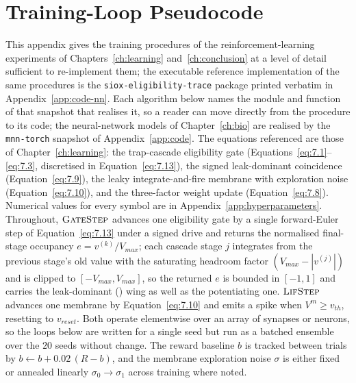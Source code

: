 \chapter{Training-Loop Pseudocode}
\label{app:pseudocode}

\noindent This appendix gives the training procedures of the reinforcement-learning
experiments of Chapters~\ref{ch:learning} and~\ref{ch:conclusion} at a level of detail
sufficient to re-implement them; the executable reference implementation of the same
procedures is the \texttt{siox-eligibility-trace} package printed verbatim in
Appendix~\ref{app:code-nn}. Each algorithm below names the module and function of that
snapshot that realises it, so a reader can move directly from the procedure to its code;
the neural-network models of Chapter~\ref{ch:bio} are realised by the \texttt{mnn-torch}
snapshot of Appendix~\ref{app:code}. The equations referenced are those of
Chapter~\ref{ch:learning}: the trap-cascade eligibility gate
(Equations~\ref{eq:7.1}--\ref{eq:7.3}, discretised in Equation~\ref{eq:7.13}), the
signed leak-dominant coincidence (Equation~\ref{eq:7.9}), the leaky integrate-and-fire
membrane with exploration noise (Equation~\ref{eq:7.10}), and the three-factor weight
update (Equation~\ref{eq:7.8}). Numerical values for every symbol are in
Appendix~\ref{app:hyperparameters}. Throughout, $\textsc{GateStep}$
advances one eligibility gate by a single forward-Euler step of Equation~\ref{eq:7.13}
under a signed drive and returns the normalised final-stage occupancy $e = v^{(k)}/V_{max}$;
each cascade stage $j$ integrates from the previous stage's old value with the
saturating headroom factor $(V_{max}-|v^{(j)}|)$ and is clipped to $[-V_{max},V_{max}]$,
so the returned $e$ is bounded in $[-1,1]$ and carries the leak-dominant ()
wing as well as the potentiating one. $\textsc{LifStep}$ advances one membrane by
Equation~\ref{eq:7.10} and emits a spike when $V^m \ge v_{th}$, resetting to $v_{reset}$.
Both operate elementwise over an array of synapses or neurons, so the loops below are
written for a single seed but run as a batched ensemble over the $20$ seeds without
change. The reward baseline $b$ is tracked between trials by
$b \leftarrow b + 0.02\,(R-b)$, and the membrane exploration noise $\sigma$ is either
fixed or annealed linearly $\sigma_0\!\to\!\sigma_1$ across training where noted.

